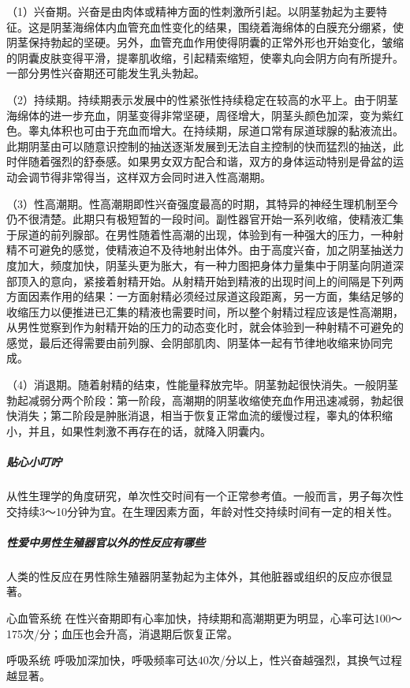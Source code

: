 （1）兴奋期。兴奋是由肉体或精神方面的性刺激所引起。以阴茎勃起为主要特征。这是阴茎海绵体内血管充血性变化的结果，围绕着海绵体的白膜充分绷紧，使阴茎保持勃起的坚硬。另外，血管充血作用使得阴囊的正常外形也开始变化，皱缩的阴囊皮肤变得平滑，提睾肌收缩，引起精索缩短，使睾丸向会阴方向有所提升。一部分男性兴奋期还可能发生乳头勃起。

（2）持续期。持续期表示发展中的性紧张性持续稳定在较高的水平上。由于阴茎海绵体的进一步充血，阴茎变得非常坚硬，周径增大，阴茎头颜色加深，变为紫红色。睾丸体积也可由于充血而增大。在持续期，尿道口常有尿道球腺的黏液流出。此期阴茎由可以随意识控制的抽送逐渐发展到无法自主控制的快而猛烈的抽送，此时伴随着强烈的舒泰感。如果男女双方配合和谐，双方的身体运动特别是骨盆的运动会调节得非常得当，这样双方会同时进入性高潮期。

（3）性高潮期。性高潮期即性兴奋强度最高的时期，其特异的神经生理机制至今仍不很清楚。此期只有极短暂的一段时间。副性器官开始一系列收缩，使精液汇集于尿道的前列腺部。在男性随着性高潮的出现，体验到有一种强大的压力，一种射精不可避免的感觉，使精液迫不及待地射出体外。由于高度兴奋，加之阴茎抽送力度加大，频度加快，阴茎头更为胀大，有一种力图把身体力量集中于阴茎向阴道深部顶入的意向，紧接着射精开始。从射精开始到精液的出现时间上的间隔是下列两方面因素作用的结果：一方面射精必须经过尿道这段距离，另一方面，集结足够的收缩压力以便推进已汇集的精液也需要时间，所以整个射精过程应该是性高潮期，从男性觉察到作为射精开始的压力的动态变化时，就会体验到一种射精不可避免的感觉，最后还得需要由前列腺、会阴部肌肉、阴茎体一起有节律地收缩来协同完成。

（4）消退期。随着射精的结束，性能量释放完毕。阴茎勃起很快消失。一般阴茎勃起减弱分两个阶段：第一阶段，高潮期的阴茎收缩使充血作用迅速减弱，勃起很快消失；第二阶段是肿胀消退，相当于恢复正常血流的缓慢过程，睾丸的体积缩小，并且，如果性刺激不再存在的话，就降入阴囊内。

\subparagraph{贴心小叮咛}

从性生理学的角度研究，单次性交时间有一个正常参考值。一般而言，男子每次性交持续3～10分钟为宜。在生理因素方面，年龄对性交持续时间有一定的相关性。

\subparagraph{性爱中男性生殖器官以外的性反应有哪些}

人类的性反应在男性除生殖器阴茎勃起为主体外，其他脏器或组织的反应亦很显著。

心血管系统
在性兴奋期即有心率加快，持续期和高潮期更为明显，心率可达100～175次/分；血压也会升高，消退期后恢复正常。

呼吸系统
呼吸加深加快，呼吸频率可达40次/分以上，性兴奋越强烈，其换气过程越显著。

